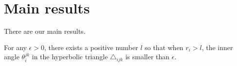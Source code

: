 %

\chapter{Main results}

There are our main results.

\begin{lemma}\label{Luo-lemma}
   \leanok
  For any $\epsilon>0$, there exists a positive number $l$ so that when $r_{i}>l$,
  the inner angle $\theta_{i}^{jk}$ in the hyperbolic triangle $\triangle_{ijk}$
  is smaller than $\epsilon$.
\end{lemma}
